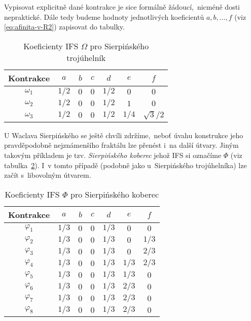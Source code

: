 Vypisovat explicitně dané kontrakce je sice formálně žádoucí,~nicméně dosti nepraktické. Dále tedy budeme hodnoty jednotlivých koeficientů $a,b,\ldots,f$ (viz \eqref{eq:afinita-v-R2}) zapisovat do tabulky.
\begin{table}[h]
    \centering
    \begin{tabular}{c|cccccc}
    Kontrakce  & $a$   & $b$ & $c$ & $d$   & $e$   & $f$          \\\hline
    $\omega_1$ & $1/2$ & $0$ & $0$ & $1/2$ & $0$   & $0$          \\
    $\omega_2$ & $1/2$ & $0$ & $0$ & $1/2$ & $1$   & $0$          \\
    $\omega_3$ & $1/2$ & $0$ & $0$ & $1/2$ & $1/4$ & $\sqrt{3}/2$ \\
    \end{tabular}
    \caption{Koeficienty IFS $\Omega$ pro Sierpińského trojúhelník}
    \label{table:ifs-sierpinskeho-trojuhelnik}
\end{table}
U Waclava Sierpińského se ještě chvíli zdržíme,~neboť úvahu konstrukce jeho pravděpodobně nejznámenšího fraktálu lze přenést i~na další útvary. Jiným takovým příkladem je tzv. \emph{Sierpińského koberec} jehož IFS si označíme $\Phi$ (viz tabulka~\ref{table:ifs-sierpinskeho-koberec}). I~v tomto případě (podobně jako u~Sierpińského trojúhelníka) lze začít s~libovolným útvarem. 
\begin{table}[h]
    \centering
    \begin{tabular}{c|cccccc}
    Kontrakce  & $a$   & $b$ & $c$ & $d$   & $e$   & $f$          \\\hline
    $\varphi_1$ & $1/3$ & $0$ & $0$ & $1/3$ & $0$   & $0$         \\
    $\varphi_2$ & $1/3$ & $0$ & $0$ & $1/3$ & $0$   & $1/3$         \\
    $\varphi_3$ & $1/3$ & $0$ & $0$ & $1/3$ & $0$   & $2/3$         \\
    $\varphi_4$ & $1/3$ & $0$ & $0$ & $1/3$ & $1/3$   & $2/3$         \\
    $\varphi_5$ & $1/3$ & $0$ & $0$ & $1/3$ & $1/3$   & $0$         \\
    $\varphi_6$ & $1/3$ & $0$ & $0$ & $1/3$ & $2/3$   & $0$         \\
    $\varphi_7$ & $1/3$ & $0$ & $0$ & $1/3$ & $2/3$   & $0$         \\
    $\varphi_8$ & $1/3$ & $0$ & $0$ & $1/3$ & $2/3$   & $0$
    \end{tabular}
    \caption{Koeficienty IFS $\Phi$ pro Sierpińského koberec}
    \label{table:ifs-sierpinskeho-koberec}
\end{table}

